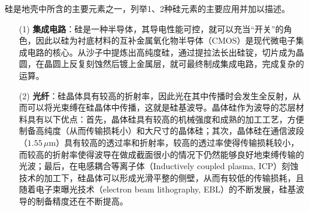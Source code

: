 \documentclass{assignment}
\begin{document}
\begin{ti}
    硅是地壳中所含的主要元素之一，列举1、2种硅元素的主要应用并加以描述。
\end{ti}
\begin{da}
    \begin{itemize}
        \item[(1)] \textbf{集成电路}：硅是一种半导体，其导电性能可控，就可以充当“开关”的角色，因此以硅为衬底材料的互补金属氧化物半导体（CMOS）是现代微电子集成电路的核心。从沙子中提炼出高纯度硅，通过提拉法长出硅锭，切片成为晶圆，在晶圆上反复刻蚀然后镀上金属层，就可最终制成集成电路，完成复杂的运算。
        \item[(2)] \textbf{光纤}：硅晶体具有较高的折射率，因此光在其中传播时会发生全反射，从而可以将光束缚在硅晶体中传播，这就是硅基波导。晶体硅作为波导的芯层材料具有以下优点：首先，晶体硅具有较高的机械强度和成熟的加工工艺，方便制备高纯度（从而传输损耗小）和大尺寸的晶体硅；其次，晶体硅在通信波段（$1.55\,\mu$m）具有较高的透过率和折射率，较高的透过率使得传输损耗较小，而较高的折射率使得波导在做成截面很小的情况下仍然能够良好地束缚传输的光波；最后，在电感耦合等离子体（Inductively coupled plasma, ICP）刻蚀技术的加工下，硅晶体可以形成光滑平整的侧壁，从而有较低的传输损耗，且随着电子束曝光技术（electron beam lithography, EBL）的不断发展，硅基波导的制备精度还在不断提高。
    \end{itemize}
\end{da}
\end{document}
